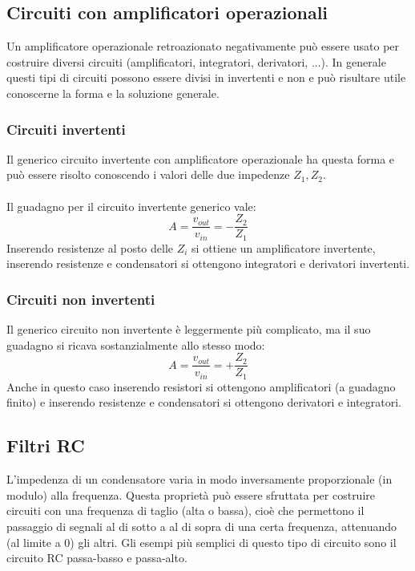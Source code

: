 \documentclass{article}
\begin{document}
\subsection{Circuiti con amplificatori operazionali}
Un amplificatore operazionale retroazionato negativamente può essere usato per costruire diversi circuiti (amplificatori, integratori, derivatori, ...). In generale questi tipi di circuiti possono essere divisi in invertenti e non e può risultare utile conoscerne la forma e la soluzione generale.

\subsubsection{Circuiti invertenti}
Il generico circuito invertente con amplificatore operazionale ha questa forma e può essere risolto conoscendo i valori delle due impedenze $Z_1,Z_2$.\\\\
Il guadagno per il circuito invertente generico vale:
$$ A = \frac{v_{out}}{v_{in}} = -\frac{Z_2}{Z_1} $$
Inserendo resistenze al posto delle $Z_i$ si ottiene un amplificatore invertente, inserendo resistenze e condensatori si ottengono integratori e derivatori invertenti.

\subsubsection{Circuiti non invertenti}
Il generico circuito non invertente è leggermente più complicato, ma il suo guadagno si ricava sostanzialmente allo stesso modo:
$$ A = \frac{v_{out}}{v_{in}} = +\frac{Z_2}{Z_1} $$
Anche in questo caso inserendo resistori si ottengono amplificatori (a guadagno finito) e inserendo resistenze e condensatori si ottengono derivatori e integratori.

\subsection{Filtri RC}
L'impedenza di un condensatore varia in modo inversamente proporzionale (in modulo) alla frequenza. Questa proprietà può essere sfruttata per costruire circuiti con una frequenza di taglio (alta o bassa), cioè che permettono il passaggio di segnali al di sotto a al di sopra di una certa frequenza, attenuando (al limite a 0) gli altri. Gli esempi più semplici di questo tipo di circuito sono il circuito RC passa-basso e passa-alto.
\end{document}
